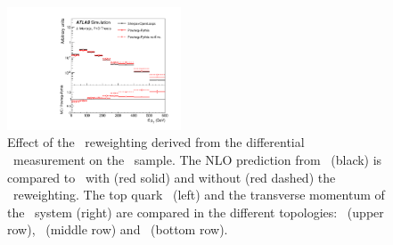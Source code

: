 \begin{figure}[!tp]
\begin{center}
  \includegraphics[width=0.46\textwidth]{Modeling/Figures/norw_tt2bq_ttbar_pt_norm}
\caption{
  Effect of the \ttbar\ reweighting derived from the differential \xsec\ measurement on the \ttbb\ sample. 
  The NLO prediction from \ShOL\ (black) is compared to \PP\ with (red solid) and without (red dashed) the \ttbar\ reweighting. The top quark \pt\ (left) and the transverse momentum of the \ttbar\ system (right) are compared in the different topologies: \ttb\ (upper row), \ttB\ (middle row) and \ttbb\ (bottom row).
}
\label{fig:ttreweighting_ttbb}
\end{center}
\end{figure}

